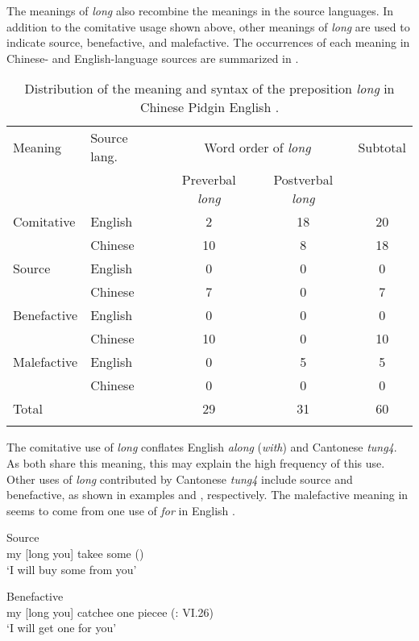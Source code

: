 \documentclass[english,output=paper,colorlinks,citecolor=brown]{../langscibook}
\begin{document}
The meanings of \textit{long} also recombine the meanings in the source languages. In addition to the comitative usage shown above, other meanings of \textit{long} are used to indicate source, benefactive, and malefactive. The occurrences of each meaning in Chinese- and English-language sources are summarized in .

\begin{table} 
\begin{tabular}{llccc}
\lsptoprule
Meaning & Source lang. & \multicolumn{2}{c}{Word order of \textit{long}} & Subtotal\\\cmidrule(lr){3-4}
&  & Preverbal \textit{long} & Postverbal \textit{long} & \\\midrule
Comitative & English & 2 & 18 & 20\\
& Chinese & 10 & 8 & 18\\
Source & English & 0 & 0 & 0\\
& Chinese & 7 & 0 & 7\\
Benefactive & English & 0 & 0 & 0\\
& Chinese & 10 & 0 & 10\\
Malefactive & English & 0 & 5 & 5\\
& Chinese & 0 & 0 & 0\\
\midrule
Total &  & 29 & 31 & 60\\
\lspbottomrule
\end{tabular}
\caption{\label{tab:7:1}Distribution of the meaning and syntax of the preposition \textit{long} in Chinese Pidgin English \citep{Li2011}.}
\end{table}

The comitative use of \textit{long} conflates English \textit{along} (\textit{with}) and Cantonese \textit{tung4}. As both share this meaning, this may explain the high frequency of this use. Other uses of \textit{long} contributed by Cantonese \textit{tung4} include source and benefactive, as shown in examples  and , respectively. The malefactive meaning in  seems to come from one use of \textit{for} in English \citep{Li2011}. 

\ea%
    \label{ex:7:7}
Source\\
my [long you] takee some (\citealt[VI.12]{Tong1862})\\
\glt ‘I will buy some from you’

\ex%
    \label{ex:7:8}
Benefactive\\
my [long you] catchee one piecee (\citealt{Tong1862}: VI.26)\\
\glt ‘I will get one for you’ 
\end{document}
